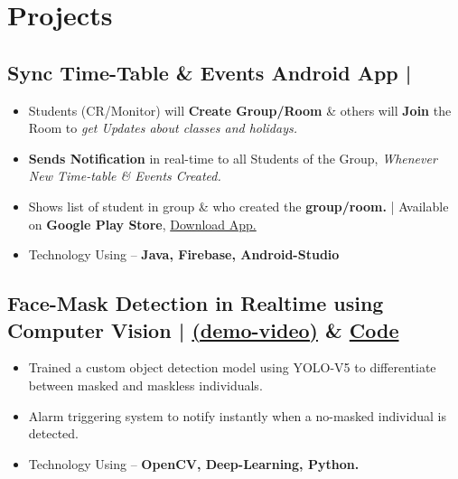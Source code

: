 \documentclass[a4,11pt]{article}
\newenvironment{zitemize}{
\begin{itemize}\itemsep0pt \parskip0pt \parsep1pt}
{\end{itemize}\vspace{-0.5cm}}
\begin{document}
\section{Projects} 
\vspace{0.2cm}
\subsection{ \large Sync Time-Table \& Events Android App | }
    \begin{zitemize}
        \item Students (CR/Monitor) will \textbf{Create  Group/Room} \& others will \textbf{Join} the Room to \emph{get Updates about classes and holidays.}
        \item \textbf{Sends Notification} in real-time to all Students of the Group,  \emph{Whenever New Time-table \& Events Created.}
        \item Shows list of student in group \& who created the \textbf{group/room.} | Available on \textbf{Google Play Store}, \href{https://play.google.com/store/apps/details?id=com.gracoder.syncwithclass}{Download App.}
        \item Technology Using – \textbf{ Java, Firebase, Android-Studio}
    \end{zitemize}


\subsection{\large Face-Mask Detection in Realtime using Computer Vision | \href{https://youtu.be/q1qlpDHZvZQ}{(demo-video)} \faGithub & \normalfont \href{https://github.com/akhilsharmaa/Real-Time-Face-Mask-Detection-YOLOv5}{Code} 
\hfill{}}
    \begin{zitemize}
        \item Trained a custom object detection model using YOLO-V5 to differentiate between masked and maskless individuals.
        \item Alarm triggering  system to notify instantly when a no-masked individual is detected.
        \item Technology Using – \textbf{OpenCV,  Deep-Learning, Python.}
    \end{zitemize}
\end{document}
